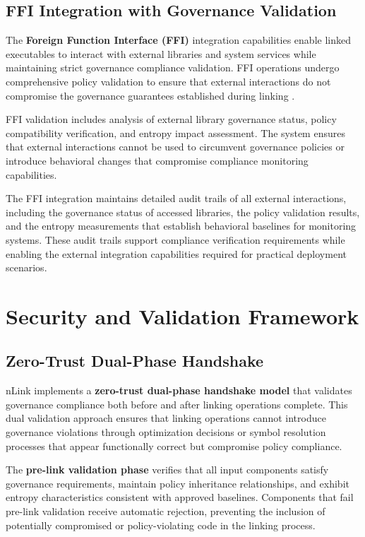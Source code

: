 \subsection{FFI Integration with Governance Validation}

The \textbf{Foreign Function Interface (FFI)} integration capabilities enable linked executables to interact with external libraries and system services while maintaining strict governance compliance validation. FFI operations undergo comprehensive policy validation to ensure that external interactions do not compromise the governance guarantees established during linking \cite{TODO:ffi-governance-validation}.

FFI validation includes analysis of external library governance status, policy compatibility verification, and entropy impact assessment. The system ensures that external interactions cannot be used to circumvent governance policies or introduce behavioral changes that compromise compliance monitoring capabilities.

The FFI integration maintains detailed audit trails of all external interactions, including the governance status of accessed libraries, the policy validation results, and the entropy measurements that establish behavioral baselines for monitoring systems. These audit trails support compliance verification requirements while enabling the external integration capabilities required for practical deployment scenarios.

\section{Security and Validation Framework}

\subsection{Zero-Trust Dual-Phase Handshake}

nLink implements a \textbf{zero-trust dual-phase handshake model} that validates governance compliance both before and after linking operations complete. This dual validation approach ensures that linking operations cannot introduce governance violations through optimization decisions or symbol resolution processes that appear functionally correct but compromise policy compliance.

The \textbf{pre-link validation phase} verifies that all input components satisfy governance requirements, maintain policy inheritance relationships, and exhibit entropy characteristics consistent with approved baselines. Components that fail pre-link validation receive automatic rejection, preventing the inclusion of potentially compromised or policy-violating code in the linking process.

